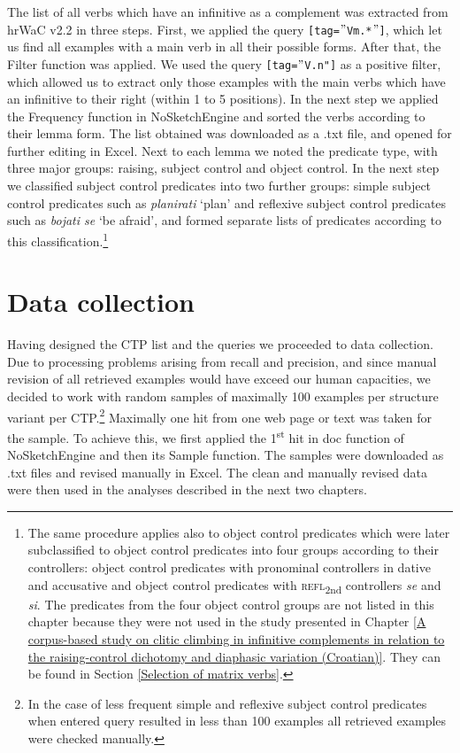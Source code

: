 The list of all verbs which have an infinitive as a complement was extracted from hrWaC v2.2 in three steps. First, we applied the query \texttt{[tag=$"$Vm.*$"$]}, which let us find all examples with a main verb in all their possible forms. After that, the Filter function was applied. We used the query \texttt{[tag=$"$V.n"]} as a positive filter, which allowed us to extract only those examples with the main verbs which have an infinitive to their right (within 1 to 5 positions). In the next step we applied the Frequency function in NoSketchEngine and sorted the verbs according to their lemma form. The list obtained was downloaded as a .txt file, and opened for further editing in Excel. Next to each lemma we noted the predicate type, with three major groups: raising, subject control and object control. In the next step we classified subject control predicates into two further groups: simple subject control predicates such as \textit{planirati} ‘plan’ and reflexive subject control predicates such as \textit{bojati se} ‘be afraid’, and formed separate lists of predicates according to this classification.\footnote{The same procedure applies also to object control predicates which were later subclassified to object control predicates into four groups according to their controllers: object control predicates with pronominal controllers in dative and accusative and object control predicates with \textsc{refl}\textsubscript{2nd} controllers \textit{se} and \textit{si}. The predicates from the four object control groups are not listed in this chapter because they were not used in the study presented in Chapter \ref{A corpus-based study on clitic climbing in infinitive complements in relation to the raising-control dichotomy and diaphasic variation (Croatian)}. They can be found in Section \ref{Selection of matrix verbs}.}

\section{Data collection}
\label{Data collection Ch 12}

Having designed the CTP list and the queries we proceeded to data collection. Due to processing problems arising from recall and precision, and since manual revision of all retrieved examples would have exceed our human capacities, we decided to work with random samples of maximally 100 examples per structure variant per CTP.\footnote{In the case of less frequent simple and reflexive subject control predicates when entered query resulted in less than 100 examples all retrieved examples were checked manually.} Maximally one hit from one web page or text was taken for the sample. To achieve this, we first applied the 1\textsuperscript{st} hit in doc function of NoSketchEngine  and then its Sample function. The samples were downloaded as .txt files and revised manually in Excel. The clean and manually revised data were then used in the analyses described in the next two chapters.
